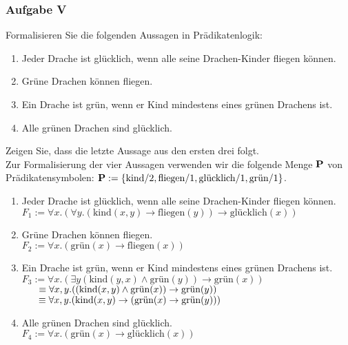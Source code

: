 \subsubsection*{Aufgabe V}
\label{REP3-V}
    Formalisieren Sie die folgenden Aussagen in Prädikatenlogik:
    \begin{enumerate}
        \item Jeder Drache ist glücklich, wenn alle seine Drachen-Kinder fliegen können.
        \item Grüne Drachen können fliegen.
        \item Ein Drache ist grün, wenn er Kind mindestens eines grünen Drachens ist.
        \item Alle grünen Drachen sind glücklich.
    \end{enumerate}
    Zeigen Sie, dass die letzte Aussage aus den ersten drei folgt. \\

    \LOES Zur Formalisierung der vier Aussagen verwenden wir die folgende Menge $\textbf{P}$ von Prädikatensymbolen: $\textbf{P} := \{\text{kind}/2, \text{fliegen}/1, \text{glücklich}/1, \text{grün}/1 \}$.
    \begin{enumerate}
        \item Jeder Drache ist glücklich, wenn alle seine Drachen-Kinder fliegen können.\\
        $F_1 := \forall x.(\forall y.(\text{kind}(x,y) \to \text{fliegen}(y)) \to \text{glücklich}(x))$

        \item Grüne Drachen können fliegen. \\
        $F_2 := \forall x.(\text{grün}(x) \to \text{fliegen}(x))$

        \item Ein Drache ist grün, wenn er Kind mindestens eines grünen Drachens ist. \\
        $F_3 := \forall x.(\exists y(\text{kind}(y, x) \land \text{grün}(y)) \to \text{grün}(x))$ \\
        $\phantom{F_3}\hspace{0.3em} \equiv \forall x,y.((\text{kind}(x, y) \land \text{grün}(x)) \to \text{grün}(y))$ \\
        $\phantom{F_3}\hspace{0.3em} \equiv \forall x,y.(\text{kind}(x,y) \to (\text{grün}(x) \to \text{grün}(y)))$

        \item Alle grünen Drachen sind glücklich. \\
        $F_4 := \forall x.(\text{grün}(x) \to \text{glücklich}(x))$
    \end{enumerate}

